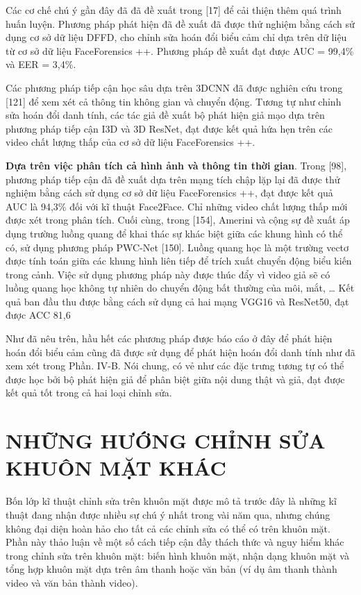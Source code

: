 \documentclass{article}
\begin{document}
Các cơ chế chú ý gần đây đã đã đề xuất trong [17] để cải thiện thêm quá trình huấn luyện. Phương pháp phát hiện đã đề xuất đã được thử nghiệm bằng cách sử dụng cơ sở dữ liệu DFFD, cho chỉnh sửa hoán đổi biểu cảm chỉ dựa trên dữ liệu từ cơ sở dữ liệu FaceForensics ++. Phương pháp đề xuất đạt được AUC = 99,4\% và EER = 3,4\%.

Các phương pháp tiếp cận học sâu dựa trên 3DCNN đã được nghiên cứu trong [121] để xem xét cả thông tin không gian và chuyển động. Tương tự như chỉnh sửa hoán đổi danh tính, các tác giả đề xuất bộ phát hiện giả mạo dựa trên phương pháp tiếp cận I3D và 3D ResNet, đạt được kết quả hứa hẹn trên các video chất lượng thấp của cơ sở dữ liệu FaceForensics ++.

\textbf{Dựa trên việc phân tích cả hình ảnh và thông tin thời gian}. Trong [98], phương pháp tiếp cận đã đề xuất dựa trên mạng tích chập lặp lại đã được thử nghiệm bằng cách sử dụng cơ sở dữ liệu FaceForensics ++, đạt được kết quả AUC là 94,3\% đối với kĩ thuật Face2Face. Chỉ những video chất lượng thấp mới được xét trong phân tích. Cuối cùng, trong [154], Amerini và cộng sự đề xuất áp dụng trường luồng quang để khai thác sự khác biệt giữa các khung hình có thể có, sử dụng phương pháp PWC-Net [150]. Luồng quang học là một trường vectơ được tính toán giữa các khung hình liên tiếp để trích xuất chuyển động biểu kiến trong cảnh. Việc sử dụng phương pháp này được thúc đẩy vì video giả sẽ có luồng quang học không tự nhiên do chuyển động bất thường của môi, mắt, … Kết quả ban đầu thu được bằng cách sử dụng cả hai mạng VGG16 và ResNet50, đạt được ACC 81,6%

Như đã nêu trên, hầu hết các phương pháp được báo cáo ở đây để phát hiện hoán đổi biểu cảm cũng đã được sử dụng để phát hiện hoán đổi danh tính như đã xem xét trong Phần. IV-B. Nói chung, có vẻ như các đặc trưng tương tự có thể được học bởi bộ phát hiện giả để phân biệt giữa nội dung thật và giả, đạt được kết quả tốt trong cả hai loại chỉnh sửa.

\section{NHỮNG HƯỚNG CHỈNH SỬA KHUÔN MẶT KHÁC}

Bốn lớp kĩ thuật chỉnh sửa trên khuôn mặt được mô tả trước đây là những kĩ thuật đang nhận được nhiều sự chú ý nhất trong vài năm qua, nhưng chúng không đại diện hoàn hảo cho tất cả các chỉnh sửa có thể có trên khuôn mặt. Phần này thảo luận về một số cách tiếp cận đầy thách thức và nguy hiểm khác trong chỉnh sửa trên khuôn mặt: biến hình khuôn mặt, nhận dạng khuôn mặt và tổng hợp khuôn mặt dựa trên âm thanh hoặc văn bản (ví dụ âm thanh thành video và văn bản thành video).
\end{document}
